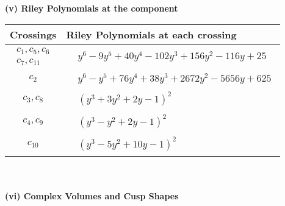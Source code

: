 \documentclass[1p]{elsarticle_modified}
\theoremstyle{definition}
\begin{document}
\newpage\renewcommand{\arraystretch}{1}
\flushleft \textbf{(v) Riley Polynomials at the component}\newline \\
\begin{tabular}{m{50pt}|m{274pt}}
Crossings & \hspace{64pt}Riley Polynomials at each crossing \\
\hline $$\begin{aligned}c_{1},c_{5},c_{6}\\c_{7},c_{11}\end{aligned}$$&$\begin{aligned}
&y^6-9 y^5+40 y^4-102 y^3+156 y^2-116 y+25
\end{aligned}$\\
\hline $$\begin{aligned}c_{2}\end{aligned}$$&$\begin{aligned}
&y^6- y^5+76 y^4+38 y^3+2672 y^2-5656 y+625
\end{aligned}$\\
\hline $$\begin{aligned}c_{3},c_{8}\end{aligned}$$&$\begin{aligned}
&(y^3+3 y^2+2 y-1)^2
\end{aligned}$\\
\hline $$\begin{aligned}c_{4},c_{9}\end{aligned}$$&$\begin{aligned}
&(y^3- y^2+2 y-1)^2
\end{aligned}$\\
\hline $$\begin{aligned}c_{10}\end{aligned}$$&$\begin{aligned}
&(y^3-5 y^2+10 y-1)^2
\end{aligned}$\\
\hline
\end{tabular}\\~\\
\newpage\flushleft \textbf{(vi) Complex Volumes and Cusp Shapes}
\end{document}
